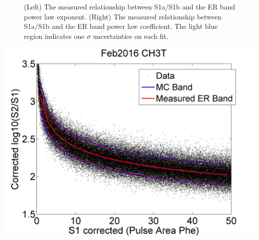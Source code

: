 \documentclass[a4paper,10pt,twocolumn]{article}
\begin{document}
\begin{figure} 
\centering
{}
\qquad
{}
\caption{ (Left) The measured relationship between S1a/S1b and the ER band power law exponent. (Right) The measured relationship between S1a/S1b and the ER band power law coefficient. The light blue region indicates one $\sigma$ uncertainties on each fit.}
\label{ERBand_S1aS1bToER}
\end{figure}


\begin{center}
\includegraphics[scale=0.45]{Run04Corrections/Feb2016_ERPrediction.png}
 \label{Feb2016ERPred}
\end{center}
\end{document}
